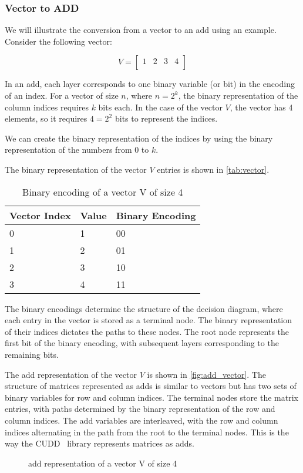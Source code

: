 \subsubsection{Vector to ADD}
We will illustrate the conversion from a vector to an \gls{add} using an example.
Consider the following vector:

\[
    V=
    \begin{bmatrix}
        1 & 2 & 3 & 4 \\
    \end{bmatrix}
\]

In an \gls{add}, each layer corresponds to one binary variable (or bit) in the encoding of an index. 
For a vector of size $n$, where $n = 2^k$, the binary representation of the column indices requires $k$ bits each. 
In the case of the vector $V$, the vector has 4 elements, so it requires $4 = 2^2$ bits to represent the indices.

We can create the binary representation of the indices by using the binary representation of the numbers from 0 to $k$.

The binary representation of the vector $V$ entries is shown in \autoref{tab:vector}.
\begin{table}[htb!]
    \centering
    \caption{Binary encoding of a vector V of size 4}
    \label{tab:vector}
    \begin{tabular}{lll}
        \toprule
        Vector Index & Value & Binary Encoding \\
        \midrule
        0            & 1     & 00            \\
        1            & 2     & 01            \\
        2            & 3     & 10            \\
        3            & 4     & 11            \\
        \bottomrule
    \end{tabular}
\end{table}
The binary encodings determine the structure of the decision diagram, where each entry in the vector is stored as a terminal node.
The binary representation of their indices dictates the paths to these nodes.
The root node represents the first bit of the binary encoding, with subsequent layers corresponding to the remaining bits.

The \gls{add} representation of the vector $V$ is shown in \autoref{fig:add_vector}.
The structure of matrices represented as \glspl{add} is similar to vectors but has two sets of binary variables for row and column indices.
The terminal nodes store the matrix entries, with paths determined by the binary representation of the row and column indices.
The \gls{add} variables are interleaved, with the row and column indices alternating in the path from the root to the terminal nodes.
This is the way the CUDD~\cite{somenzi1997cudd} library represents matrices as \glspl{add}.
\begin{figure}[htb!]
    \centering
    
    \caption{\gls{add} representation of a vector V of size 4}
    \label{fig:add_vector}
\end{figure}

